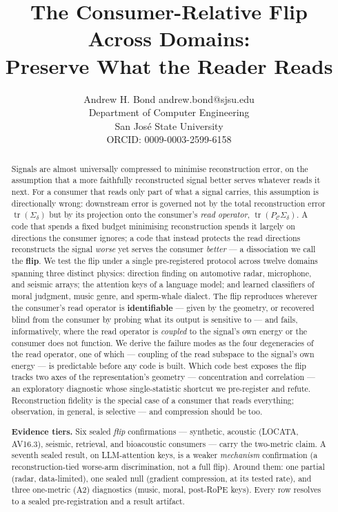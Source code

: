 \documentclass[10pt]{article} %
\title{The Consumer-Relative Flip Across Domains:\\ Preserve What the Reader Reads}
\author{\name Andrew H. Bond \email andrew.bond@sjsu.edu \\
      \addr Department of Computer Engineering \\
      San Jos\'e State University \\
      ORCID: 0009-0003-2599-6158}
\theoremstyle{remark}
\newcommand{\PC}{P_{\mathcal{C}}}
\newcommand{\Sd}{\Sigma_{\delta}}
\newcommand{\tr}{\operatorname{tr}}
\begin{document}
\maketitle

\begin{abstract}
Signals are almost universally compressed to minimise reconstruction error, on the
assumption that a more faithfully reconstructed signal better serves whatever reads it
next. For a consumer that reads only part of what a signal carries, this assumption is
directionally wrong: downstream error is governed not by the total reconstruction error
$\tr(\Sd)$ but by its projection onto the consumer's \emph{read operator},
$\tr(\PC\Sd)$. A code that spends a fixed budget minimising reconstruction spends it
largely on directions the consumer ignores; a code that instead protects the read
directions reconstructs the signal \emph{worse} yet serves the consumer \emph{better}
--- a dissociation we call the \textbf{flip}. We test the flip under a single
pre-registered protocol across twelve domains spanning three distinct physics:
direction finding on automotive radar, microphone, and seismic arrays; the attention
keys of a language model; and learned classifiers of moral judgment, music genre, and
sperm-whale dialect. The flip reproduces wherever the consumer's read operator is
\textbf{identifiable} --- given by the geometry, or recovered blind from the consumer by
probing what its output is sensitive to --- and fails, informatively, where the
read operator is \emph{coupled} to the signal's own energy or the consumer does not
function. We derive the failure modes as the four degeneracies of the read operator, one of which
--- coupling of the read subspace to the signal's own energy --- is predictable before any
code is built. Which code best exposes the flip tracks
two axes of the representation's geometry --- concentration and correlation --- an
exploratory diagnostic whose single-statistic shortcut we pre-register and refute. Reconstruction fidelity is the
special case of a consumer that reads everything; observation, in general, is selective
--- and compression should be too.

\medskip
\noindent\textbf{Evidence tiers.} Six sealed \emph{flip} confirmations --- synthetic,
acoustic (LOCATA, AV16.3), seismic, retrieval, and bioacoustic consumers --- carry the
two-metric claim. A seventh sealed result, on LLM-attention keys, is a weaker
\emph{mechanism} confirmation (a reconstruction-tied worse-arm discrimination, not a full
flip). Around them: one partial (radar, data-limited), one sealed null (gradient
compression, at its tested rate), and three one-metric (A2) diagnostics (music, moral,
post-RoPE keys). Every row resolves to a sealed pre-registration and a result artifact.
\end{abstract}
\end{document}
